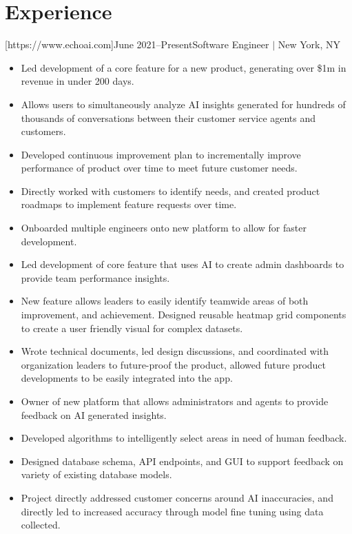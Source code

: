 \documentclass[letterpaper,11pt]{article}
\newcommand{\Item}[1]{
  \item\small{
    \parbox[t]{500pt}{\raggedright#1}
  }
}
\newenvironment{HeadingList}{
  \begin{mdframed}[
    topline=false,
    bottomline=false,
    rightline=false,
    leftline=false,
    linecolor=gray,
    linewidth=0pt,
    leftmargin=0pt,
    innerleftmargin=0pt,
    innertopmargin=0pt,
    innerbottommargin=0pt,
    innerrightmargin=0pt,
    skipabove=\parsep,
    skipbelow=\parsep,
  ]
  \begin{itemize}[leftmargin=0pt, label={}]
}{
  \end{itemize}
  \end{mdframed}
}
\newenvironment{SubHeadingList}{
  \begin{mdframed}[
    leftline=true,
    linecolor=gray,
    linewidth=.5pt,
    leftmargin=8pt,
    innerleftmargin=8pt,
  ]
  \begin{itemize}[leftmargin=0pt, label={}]
}{
  \end{itemize}
  \end{mdframed}
}
\newenvironment{ItemList}{
  \begin{itemize}[itemsep=4pt, topsep=-3pt, partopsep=0pt, parsep=0pt, leftmargin=20pt, label=\raisebox{0.4ex}{\scalebox{0.5}{\textbullet}}]
}{\end{itemize}}
\begin{document}



\section{Experience}
    \begin{HeadingList}
        [https://www.echoai.com]{June 2021--Present}{Software Engineer $|$ New York, NY}
            \begin{SubHeadingList}

                \begin{ItemList}
                    \Item{Led development of a core feature for a new product, generating over \$1m in revenue in under 200 days.}
                    \Item{Allows users to simultaneously analyze AI insights generated for hundreds of thousands of conversations between their customer service agents and customers.}
                    \Item{Developed continuous improvement plan to incrementally improve performance of product over time to meet future customer needs.}
                    \Item{Directly worked with customers to identify needs, and created product roadmaps to implement feature requests over time.}
                    \Item{Onboarded multiple engineers onto new platform to allow for faster development.}
                \end{ItemList}

                \begin{ItemList}
                    \Item{Led development of core feature that uses AI to create admin dashboards to provide team performance insights.}
                    \Item{New feature allows leaders to easily identify teamwide areas of both improvement, and achievement. Designed reusable heatmap grid components to create a user friendly visual for complex datasets.}
                    \Item{Wrote technical documents, led design discussions, and coordinated with organization leaders to future-proof the product, allowed future product developments to be easily integrated into the app.}
                \end{ItemList}

                \begin{ItemList}
                    \Item{Owner of new platform that allows administrators and agents to provide feedback on AI generated insights.}
                    \Item{Developed algorithms to intelligently select areas in need of human feedback.}
                    \Item{Designed database schema, API endpoints, and GUI to support feedback on variety of existing database models.}
                    \Item{Project directly addressed customer concerns around AI inaccuracies, and directly led to increased accuracy through model fine tuning using data collected.}
                \end{ItemList}


\end{SubHeadingList}
\end{HeadingList}
\end{document}

